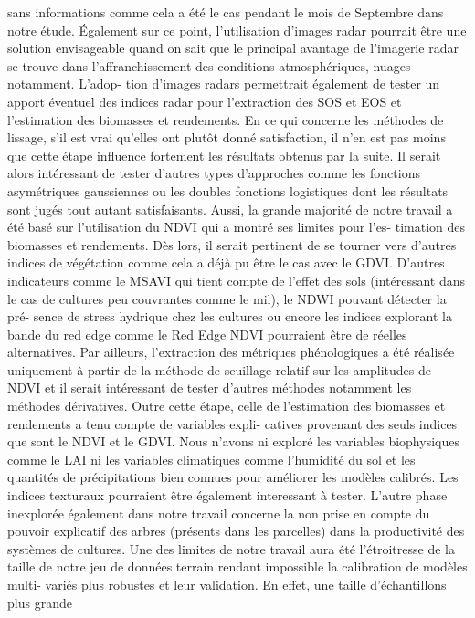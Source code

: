 sans informations comme cela a été le cas pendant le mois de Septembre dans notre
étude. Également sur ce point, l’utilisation d’images radar pourrait être une solution
envisageable quand on sait que le principal avantage de l’imagerie radar se trouve
dans l’affranchissement des conditions atmosphériques, nuages notamment. L’adop-
tion d’images radars permettrait également de tester un apport éventuel des indices
radar pour l’extraction des SOS et EOS et l’estimation des biomasses et rendements.
En ce qui concerne les méthodes de lissage, s’il est vrai qu’elles ont plutôt donné
satisfaction, il n’en est pas moins que cette étape influence fortement les résultats
obtenus par la suite. Il serait alors intéressant de tester d’autres types d’approches
comme les fonctions asymétriques gaussiennes ou les doubles fonctions logistiques dont les résultats sont jugés tout autant satisfaisants. Aussi, la grande majorité de
notre travail a été basé sur l’utilisation du NDVI qui a montré ses limites pour l’es-
timation des biomasses et rendements. Dès lors, il serait pertinent de se tourner vers
d’autres indices de végétation comme cela a déjà pu être le cas avec le GDVI. D’autres
indicateurs comme le MSAVI qui tient compte de l’effet des sols (intéressant dans
le cas de cultures peu couvrantes comme le mil), le NDWI pouvant détecter la pré-
sence de stress hydrique chez les cultures ou encore les indices explorant la bande
du red edge comme le Red Edge NDVI pourraient être de réelles alternatives. Par
ailleurs, l’extraction des métriques phénologiques a été réalisée uniquement à partir
de la méthode de seuillage relatif sur les amplitudes de NDVI et il serait intéressant
de tester d’autres méthodes notamment les méthodes dérivatives. Outre cette étape,
celle de l’estimation des biomasses et rendements a tenu compte de variables expli-
catives provenant des seuls indices que sont le NDVI et le GDVI. Nous n’avons ni
exploré les variables biophysiques comme le LAI ni les variables climatiques comme
l’humidité du sol et les quantités de précipitations bien connues pour améliorer les
modèles calibrés. Les indices texturaux pourraient être également interessant à tester.
L’autre phase inexplorée également dans notre travail concerne la non prise en compte
du pouvoir explicatif des arbres (présents dans les parcelles) dans la productivité des
systèmes de cultures. Une des limites de notre travail aura été l’étroitresse de la taille
de notre jeu de données terrain rendant impossible la calibration de modèles multi-
variés plus robustes et leur validation. En effet, une taille d’échantillons plus grande

